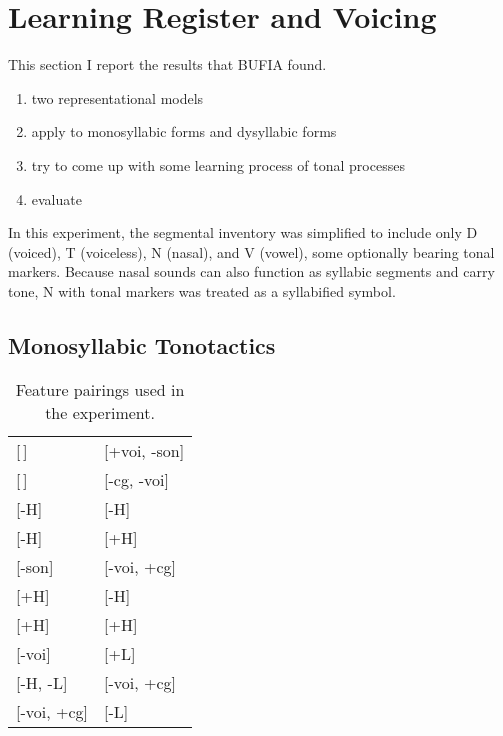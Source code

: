 \documentclass[11pt]{article}
\begin{document}
\section{Learning Register and Voicing}
 This section I report the results that BUFIA found. 
 \begin{enumerate}
\item two representational models
\item apply to monosyllabic forms and dysyllabic forms
\item try to come up with some learning process of tonal processes
\item evaluate 
 \end{enumerate}

In this experiment, the segmental inventory was simplified to include only D (voiced), T (voiceless), N (nasal), and V (vowel), some optionally bearing tonal markers. Because nasal sounds can also function as syllabic segments and carry tone, N with tonal markers was treated as a syllabified symbol.

\subsection{Monosyllabic Tonotactics}
\begin{table}[h!]
	\centering
	\begin{tabular}{ll}
		\hline
		{[\,]} & {[+voi, -son]} \\
		{[\,]} & {[-cg, -voi]} \\
		{[-H]} & {[-H]} \\
		{[-H]} & {[+H]} \\
		{[-son]} & {[-voi, +cg]} \\
		{[+H]} & {[-H]} \\
		{[+H]} & {[+H]} \\
		{[-voi]} & {[+L]} \\
		{[-H, -L]} & {[-voi, +cg]} \\
		{[-voi, +cg]} & {[-L]} \\
		\hline
	\end{tabular}
	\caption{Feature pairings used in the experiment.}
\end{table}





\end{document}
